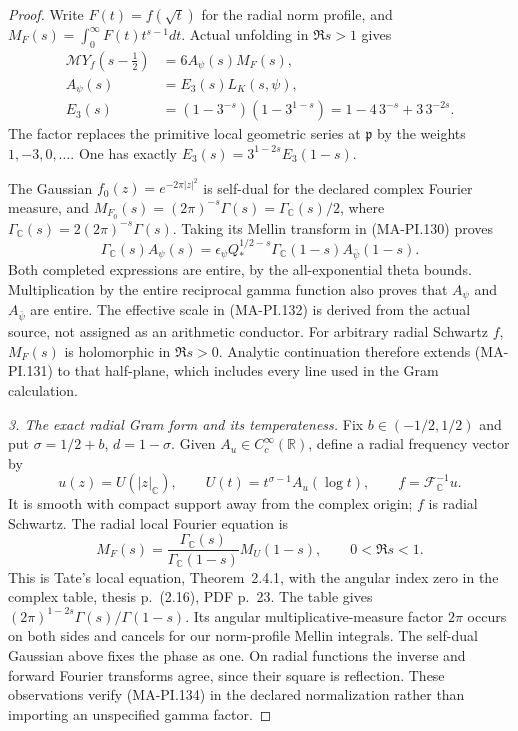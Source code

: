 \begin{proof}
Write $F(t)=f(\sqrt t)$ for the radial norm profile, and
$M_F(s)=\int_0^\infty F(t)t^{s-1}dt$.
Actual unfolding in $\Re s>1$ gives
\[
 \begin{split}
 \mathcal M Y_f(s-\tfrac12)&=6A_\psi(s)M_F(s),\\
 A_\psi(s)&=E_3(s)L_K(s,\psi),\\
 E_3(s)&=(1-3^{-s})(1-3^{1-s})
           =1-4\,3^{-s}+3\,3^{-2s}.
 \end{split}
 \tag{MA-PI.131}
\]
The factor replaces the primitive local geometric series
at $\mathfrak p$ by the weights $1,-3,0,\ldots$.
One has exactly
$E_3(s)=3^{1-2s}E_3(1-s)$.

The Gaussian $f_0(z)=e^{-2\pi|z|^2}$ is self-dual for the
declared complex Fourier measure, and
$M_{F_0}(s)=(2\pi)^{-s}\Gamma(s)=\Gamma_{\mathbb C}(s)/2$,
where $\Gamma_{\mathbb C}(s)=2(2\pi)^{-s}\Gamma(s)$.
Taking its Mellin transform in (MA-PI.130) proves
\[
 \Gamma_{\mathbb C}(s)A_\psi(s)
   =\epsilon_\psi Q_*^{1/2-s}
                \Gamma_{\mathbb C}(1-s)A_{\bar\psi}(1-s).
 \tag{MA-PI.132}
\]
Both completed expressions are entire, by the
all-exponential theta bounds.  Multiplication by the
entire reciprocal gamma function also proves that
$A_\psi$ and $A_{\bar\psi}$ are entire.  The effective
scale in (MA-PI.132) is derived from the actual source,
not assigned as an arithmetic conductor.
For arbitrary radial Schwartz $f$, $M_F(s)$ is holomorphic
in $\Re s>0$.  Analytic continuation therefore extends
(MA-PI.131) to that half-plane, which includes every
line used in the Gram calculation.

\emph{3. The exact radial Gram form and its temperateness.}
Fix $b\in(-1/2,1/2)$ and put
$\sigma=1/2+b$, $d=1-\sigma$.
Given $A_u\in C_c^\infty(\mathbb R)$, define a radial
frequency vector by
\[
 u(z)=U(|z|_{\mathbb C}),\qquad
 U(t)=t^{\sigma-1}A_u(\log t),\qquad
 f=\mathcal F_{\mathbb C}^{-1}u.
 \tag{MA-PI.133}
\]
It is smooth with compact support away from the complex
origin; $f$ is radial Schwartz.
The radial local Fourier equation is
\[
 M_F(s)=\frac{\Gamma_{\mathbb C}(s)}
                  {\Gamma_{\mathbb C}(1-s)}M_U(1-s),
                 \qquad0<\Re s<1.
 \tag{MA-PI.134}
\]
This is Tate's local equation, Theorem~2.4.1, with the
angular index zero in the complex table, thesis p.~(2.16),
PDF p.~23.  The table gives
$(2\pi)^{1-2s}\Gamma(s)/\Gamma(1-s)$.
Its angular multiplicative-measure factor $2\pi$ occurs
on both sides and cancels for our norm-profile Mellin
integrals.  The self-dual Gaussian above fixes the phase
as one.  On radial functions the inverse and forward
Fourier transforms agree, since their square is reflection.
These observations verify (MA-PI.134) in the declared
normalization rather than importing an unspecified gamma factor.


\end{proof}
